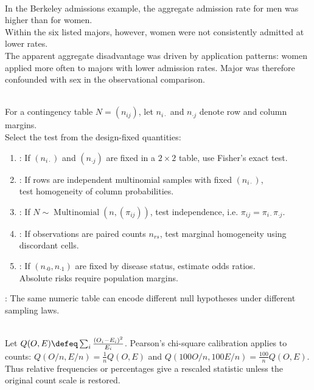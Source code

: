\begin{example} \label{ex:berkeley-admissions-confounding} \\
In the Berkeley admissions example, the aggregate admission rate for men was higher than for women. \\
Within the six listed majors, however, women were not consistently admitted at lower rates. \\
The apparent aggregate disadvantage was driven by application patterns: women applied more often to majors with lower admission rates. Major was therefore confounded with sex in the observational comparison.
\end{example}

\begin{principle} \label{prin:categorical-data-design-before-test} \\
For a contingency table $N=(n_{ij})$, let $n_{i\cdot}$ and $n_{\cdot j}$ denote row and column margins.\\
Select the test from the design-fixed quantities:
\begin{enumerate}[label=(\roman*)]
\setlength{\itemsep}{0pt}
\item {}: If $(n_{i\cdot})$ and $(n_{\cdot j})$ are fixed in a $2\times2$ table, use Fisher's exact test.
\item {}: If rows are independent multinomial samples with fixed $(n_{i\cdot})$,\\
test homogeneity of column probabilities.
\item {}: If $N\sim\operatorname{Multinomial}(n,(\pi_{ij}))$, test independence, i.e. $\pi_{ij}=\pi_{i\cdot}\pi_{\cdot j}$.
\item {}: If observations are paired counts $n_{rs}$, test marginal homogeneity using discordant cells.
\item {}: If $(n_{\cdot0},n_{\cdot1})$ are fixed by disease status, estimate odds ratios.\\
Absolute risks require population margins.
\end{enumerate}
: The same numeric table can encode different null hypotheses under different sampling laws.
\end{principle}

\begin{remark} \label{rem:counts-not-percentages-in-chi-square-tests} \\
Let $Q(O,E)\defeq\sum_i\frac{(O_i-E_i)^2}{E_i}$. Pearson's chi-square calibration applies to counts: $Q(O/n,E/n)=\frac{1}{n}Q(O,E)$ and $Q(100O/n,100E/n)=\frac{100}{n}Q(O,E)$. Thus relative frequencies or percentages give a rescaled statistic unless the original count scale is restored.
\end{remark}

